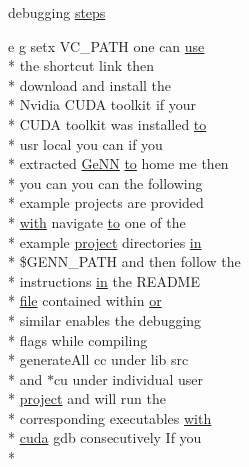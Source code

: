 \begin{DoxyCompactItemize}
debugging \hyperlink{README_8txt_a23fa43bc7cc89dc7dbe6586e54044dff}{steps}
\item 
e g setx V\+C\+\_\+\+P\+A\+T\+H one can \hyperlink{README_8txt_acf386c48a14a2099c9220d6bcde40fc8}{use} \\*
the shortcut link then \\*
download and install the \\*
Nvidia C\+U\+D\+A toolkit if your \\*
C\+U\+D\+A toolkit was installed \hyperlink{README_8txt_add1f2ee32acc15ef77f839d4382c9768}{to} \\*
usr local you can if you \\*
extracted \hyperlink{README_8txt_a431a8d9aae97c72793fee7c3edd68559}{Ge\+N\+N} \hyperlink{README_8txt_add1f2ee32acc15ef77f839d4382c9768}{to} home me then \\*
you can you can the following \\*
example projects are provided \\*
\hyperlink{userproject_2OneComp__project_2README_8txt_ace09bb40fbf4457ad9a9340a67a4fa9a}{with} navigate \hyperlink{README_8txt_add1f2ee32acc15ef77f839d4382c9768}{to} one of the \\*
example \hyperlink{userproject_2SynDelay__project_2README_8txt_a762c750134e07a31b7965860fd292b51}{project} directories \hyperlink{README_8txt_a148897a6b2cc9cff25af80abb13426b0}{in} \\*
\$G\+E\+N\+N\+\_\+\+P\+A\+T\+H and then follow the \\*
instructions \hyperlink{README_8txt_a148897a6b2cc9cff25af80abb13426b0}{in} the R\+E\+A\+D\+M\+E \\*
\hyperlink{README_8txt_a6f45b2930c1b79b67034355b4701dc56}{file} contained within \hyperlink{userproject_2PoissonIzh__project_2README_8txt_ad4021097ab0ba066271614bf3f4c2e27}{or} \\*
similar enables the debugging \\*
flags while compiling \\*
generate\+All cc under lib src \\*
and $\ast$cu under individual user \\*
\hyperlink{userproject_2SynDelay__project_2README_8txt_a762c750134e07a31b7965860fd292b51}{project} and will run the \\*
corresponding executables \hyperlink{userproject_2OneComp__project_2README_8txt_ace09bb40fbf4457ad9a9340a67a4fa9a}{with} \\*
\hyperlink{README_8txt_a386e5818501e36b046e9cf9ee9a1a6b0}{cuda} gdb consecutively If you \\*

\end{DoxyCompactItemize}
